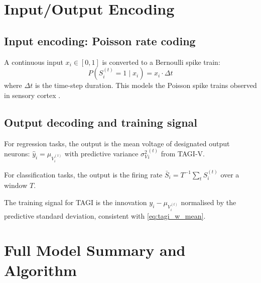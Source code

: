 \documentclass[12pt, a4paper]{article}
\newcommand{\mV}{\mu_{V}}
\newcommand{\sV}{\sigma^{2}_{V}}
\begin{document}
\section{Input/Output Encoding}
\label{sec:io}

\subsection{Input encoding: Poisson rate coding}

A continuous input $x_i \in [0,1]$ is converted to a Bernoulli spike train:
\begin{equation}
    P\!\left(S_i^{(t)} = 1 \mid x_i\right) = x_i \cdot \Delta t
    \label{eq:poisson}
\end{equation}
where $\Delta t$ is the time-step duration. This models the Poisson spike trains
observed in sensory cortex \citep{softky1993highly}.

\subsection{Output decoding and training signal}

For regression tasks, the output is the mean voltage of designated output neurons:
$\hat{y}_i = \mV_i^{(t)}$ with predictive variance $\sV_i^{(t)}$ from TAGI-V.

For classification tasks, the output is the firing rate $\bar{S}_i = T^{-1}\sum_t S_i^{(t)}$
over a window $T$.

The training signal for TAGI is the innovation $y_i - \mV_i^{(t)}$ normalised by the
predictive standard deviation, consistent with \eqref{eq:tagi_w_mean}.

\section{Full Model Summary and Algorithm}
\label{sec:summary}
\end{document}
